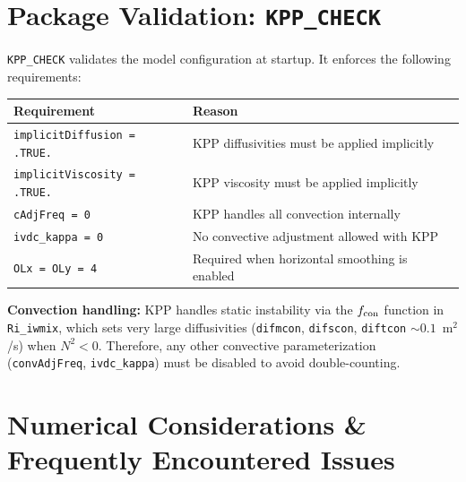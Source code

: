 \documentclass[12pt,letterpaper]{article}
\begin{document}
\section{Package Validation: \texttt{KPP\_CHECK}}  
  
\texttt{KPP\_CHECK} validates the model configuration at startup.  
It enforces the following requirements:  
  
\begin{longtable}{ll}  
\toprule  
\textbf{Requirement} & \textbf{Reason} \\  
\midrule  
\endhead  
\texttt{implicitDiffusion = .TRUE.} &  
  KPP diffusivities must be applied implicitly \\  
\texttt{implicitViscosity = .TRUE.} &  
  KPP viscosity must be applied implicitly \\  
\texttt{cAdjFreq = 0} &  
  KPP handles all convection internally \\  
\texttt{ivdc\_kappa = 0} &  
  No convective adjustment allowed with KPP \\  
\texttt{OLx = OLy = 4} &  
  Required when horizontal smoothing is enabled \\  
\bottomrule  
\end{longtable}  
  
\begin{warnbox}  
\textbf{Convection handling:} KPP handles static instability via the  
$f_{\rm con}$ function in \texttt{Ri\_iwmix}, which sets very large  
diffusivities (\texttt{difmcon}, \texttt{difscon}, \texttt{diftcon}  
$\sim 0.1$~m$^2$/s) when $N^2 < 0$. Therefore, any other convective  
parameterization (\texttt{convAdjFreq}, \texttt{ivdc\_kappa}) must  
be disabled to avoid double-counting.  
\end{warnbox}  
  
\section{Numerical Considerations \& Frequently Encountered Issues}  
\label{sec:numerical_considerations}  
  
\end{document}
